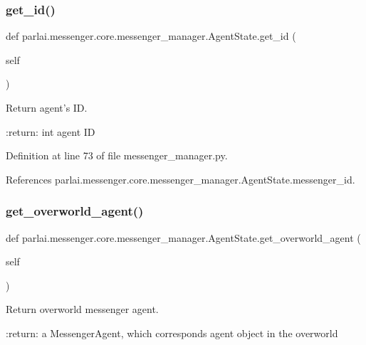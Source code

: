 \subsubsection{\texorpdfstring{get\+\_\+id()}{get\_id()}}
{\footnotesize\ttfamily def parlai.\+messenger.\+core.\+messenger\+\_\+manager.\+Agent\+State.\+get\+\_\+id (\begin{DoxyParamCaption}\item[{}]{self }\end{DoxyParamCaption})}

\begin{DoxyVerb}Return agent's ID.

:return:
    int agent ID
\end{DoxyVerb}
 

Definition at line 73 of file messenger\+\_\+manager.\+py.



References parlai.\+messenger.\+core.\+messenger\+\_\+manager.\+Agent\+State.\+messenger\+\_\+id.

\mbox{\label{classparlai_1_1messenger_1_1core_1_1messenger__manager_1_1AgentState_a40c9b4e3bc2873d6754c5bd3dc2fb547}} 
\subsubsection{\texorpdfstring{get\+\_\+overworld\+\_\+agent()}{get\_overworld\_agent()}}
{\footnotesize\ttfamily def parlai.\+messenger.\+core.\+messenger\+\_\+manager.\+Agent\+State.\+get\+\_\+overworld\+\_\+agent (\begin{DoxyParamCaption}\item[{}]{self }\end{DoxyParamCaption})}

\begin{DoxyVerb}Return overworld messenger agent.

:return:
    a MessengerAgent, which corresponds agent object in the overworld
\end{DoxyVerb}
 

